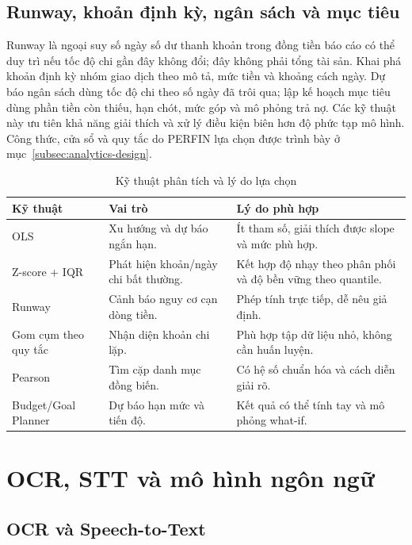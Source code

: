 \subsection{Runway, khoản định kỳ, ngân sách và mục tiêu}

Runway là ngoại suy số ngày số dư thanh khoản trong đồng tiền báo cáo có thể duy trì nếu tốc độ chi gần đây không đổi; đây không phải tổng tài sản. Khai phá khoản định kỳ nhóm giao dịch theo mô tả, mức tiền và khoảng cách ngày. Dự báo ngân sách dùng tốc độ chi theo số ngày đã trôi qua; lập kế hoạch mục tiêu dùng phần tiền còn thiếu, hạn chót, mức góp và mô phỏng trả nợ. Các kỹ thuật này ưu tiên khả năng giải thích và xử lý điều kiện biên hơn độ phức tạp mô hình. Công thức, cửa sổ và quy tắc do PERFIN lựa chọn được trình bày ở mục~\ref{subsec:analytics-design}.

\begin{table}[H]
  \centering
  \caption{Kỹ thuật phân tích và lý do lựa chọn}
  \label{tab:algorithm-selection}
  \begin{tabularx}{\textwidth}{@{}L{3.0cm}Y Y@{}}
    \toprule
    \textbf{Kỹ thuật} & \textbf{Vai trò} & \textbf{Lý do phù hợp} \\
    \midrule
    OLS & Xu hướng và dự báo ngắn hạn. & Ít tham số, giải thích được slope và mức phù hợp. \\
    Z-score + IQR & Phát hiện khoản/ngày chi bất thường. & Kết hợp độ nhạy theo phân phối và độ bền vững theo quantile. \\
    Runway & Cảnh báo nguy cơ cạn dòng tiền. & Phép tính trực tiếp, dễ nêu giả định. \\
    Gom cụm theo quy tắc & Nhận diện khoản chi lặp. & Phù hợp tập dữ liệu nhỏ, không cần huấn luyện. \\
    Pearson & Tìm cặp danh mục đồng biến. & Có hệ số chuẩn hóa và cách diễn giải rõ. \\
    Budget/Goal Planner & Dự báo hạn mức và tiến độ. & Kết quả có thể tính tay và mô phỏng what-if. \\
    \bottomrule
  \end{tabularx}
\end{table}

\section{OCR, STT và mô hình ngôn ngữ}

\subsection{OCR và Speech-to-Text}
\label{subsec:ocr-stt}

